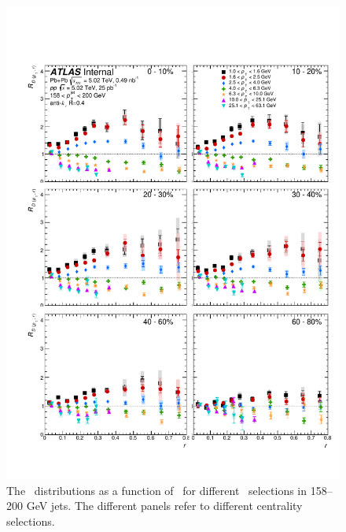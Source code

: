 \begin{figure}[h]
\includegraphics[width=1.0\textwidth]{figures/results/RDpT_dR_jet8}
\caption{The \RDptr\ distributions as a function of \rvar\ for different \pt\ selections in 158--200 GeV jets.
The different panels refer to different centrality selections.}
\label{fig:fullset_rptr_j8}
\end{figure}

